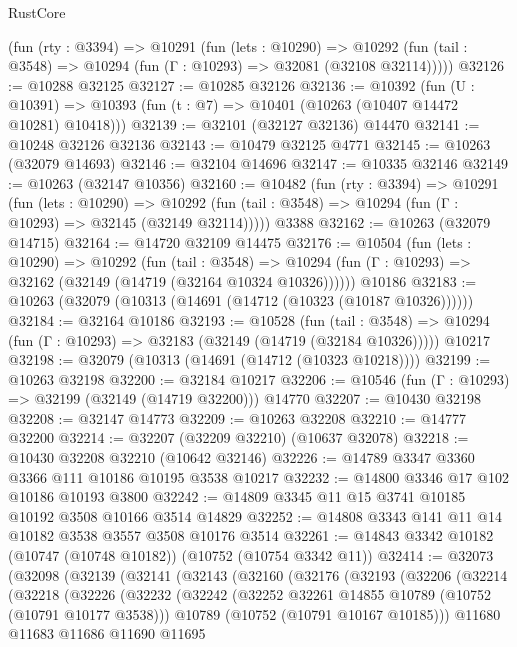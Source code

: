 \begin{lexlean}{RustCore}
\begin{coremodule}
    (fun (rty : @3394) =>
    @10291
      (fun (lets : @10290) =>
      @10292 (fun (tail : @3548) => @10294 (fun (Γ : @10293) => @32081 (@32108 @32114)))))
@32126 := @10288 @32125
@32127 := @10285 @32126
@32136 := @10392
    (fun (U : @10391) => @10393 (fun (t : @7) => @10401 (@10263 (@10407 @14472 @10281) @10418)))
@32139 := @32101 (@32127 @32136) @14470
@32141 := @10248 @32126 @32136
@32143 := @10479 @32125 @4771
@32145 := @10263 (@32079 @14693)
@32146 := @32104 @14696
@32147 := @10335 @32146
@32149 := @10263 (@32147 @10356)
@32160 := @10482
    (fun (rty : @3394) =>
    @10291
      (fun (lets : @10290) =>
      @10292 (fun (tail : @3548) => @10294 (fun (Γ : @10293) => @32145 (@32149 @32114)))))
    @3388
@32162 := @10263 (@32079 @14715)
@32164 := @14720 @32109 @14475
@32176 := @10504
    (fun (lets : @10290) =>
    @10292
      (fun (tail : @3548) =>
      @10294 (fun (Γ : @10293) => @32162 (@32149 (@14719 (@32164 @10324 @10326))))))
    @10186
@32183 := @10263 (@32079 (@10313 (@14691 (@14712 (@10323 (@10187 @10326))))))
@32184 := @32164 @10186
@32193 := @10528
    (fun (tail : @3548) => @10294 (fun (Γ : @10293) => @32183 (@32149 (@14719 (@32184 @10326)))))
    @10217
@32198 := @32079 (@10313 (@14691 (@14712 (@10323 @10218))))
@32199 := @10263 @32198
@32200 := @32184 @10217
@32206 := @10546 (fun (Γ : @10293) => @32199 (@32149 (@14719 @32200))) @14770
@32207 := @10430 @32198
@32208 := @32147 @14773
@32209 := @10263 @32208
@32210 := @14777 @32200
@32214 := @32207 (@32209 @32210) (@10637 @32078)
@32218 := @10430 @32208 @32210 (@10642 @32146)
@32226 := @14789 @3347 @3360 @3366 @111 @10186 @10195 @3538 @10217
@32232 := @14800 @3346 @17 @102 @10186 @10193 @3800
@32242 := @14809 @3345 @11 @15 @3741 @10185 @10192 @3508 @10166 @3514 @14829
@32252 := @14808 @3343 @141 @11 @14 @10182 @3538 @3557 @3508 @10176 @3514
@32261 := @14843 @3342 @10182 (@10747 (@10748 @10182)) (@10752 (@10754 @3342 @11))
@32414 := @32073
    (@32098
      (@32139
        (@32141
          (@32143
            (@32160
              (@32176
                (@32193
                  (@32206
                    (@32214
                      (@32218
                        (@32226
                          (@32232
                            (@32242
                              (@32252 @32261 @14855 @10789 (@10752 (@10791 @10177 @3538)))
                              @10789
                              (@10752 (@10791 @10167 @10185)))
                            @11680
                            @11683
                            @11686
                            @11690
                            @11695

\end{coremodule}
\end{lexlean}
